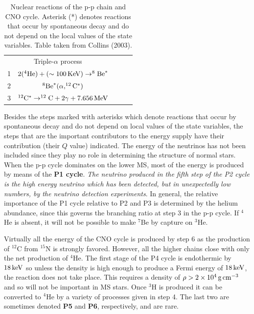 \documentclass[a4paper,10pt]{article}
\begin{document}
\begin{table}[t]
\begin{tabular}{lll|lll}
\cline{1-3}
\multicolumn{3}{c|}{Triple-$\alpha$ process} \\
\cline{1-3}
 1     & \multicolumn{2}{c|}{$2(^4{\rm He})+(\sim100\,{\rm KeV})\rightarrow^8{\rm Be}^*$} \\
 2     & \multicolumn{2}{c|}{$^8{\rm Be}^*(\alpha,^{12}{\rm C}^*)$} \\
 3     & \multicolumn{2}{c|}{$^{12}{\rm C}^*\rightarrow^{12}{\rm C}+2\gamma+7.656\,{\rm MeV}$} \\
 \hline
\end{tabular}
\caption{Nuclear reactions of the p-p chain and CNO cycle. Asterisk (*) denotes reactions that occur by spontaneous decay and do not depend on the local values of the state variables. Table taken from Collins (2003).}
\label{table:nuclearreactions}
\end{table}

{\noindent}Besides the steps marked with asterisks which denote reactions that occur by spontaneous decay and do not depend on local values of the state variables, the steps that are the important contributors to the energy supply have their contribution (their $Q$ value) indicated. The energy of the neutrinos has not been included since they play no role in determining the structure of normal stars. When the p-p cycle dominates on the lower MS, most of the energy is produced by means of the \textbf{P1 cycle}. \textit{The neutrino produced in the fifth step of the P2 cycle is the high energy neutrino which has been detected, but in unexpectedly low numbers, by the neutrino detection experiments}. In general, the relative importance of the P1 cycle relative to P2 and P3 is determined by the helium abundance, since this governs the branching ratio at step $3$ in the p-p cycle. If $^4$He is absent, it will not be possible to make $^7$Be by capture on $^3$He.

{\noindent}Virtually all the energy of the CNO cycle is produced by step 6 as the production of $^{12}$C from $^{15}$N is strongly favored. However, all the higher chains close with only the net production of $^4$He. The first stage of the P4 cycle is endothermic by $18\,{\rm keV}$ so unless the density is high enough to produce a Fermi energy of $18\,{\rm keV}$, the reaction does not take place. This requires a density of $\rho>2\times10^4\,{\rm g\,cm^{-3}}$ and so will not be important in MS stars. Once $^3$H is produced it can be converted to $^4$He by a variety of processes given in step 4. The last two are sometimes denoted \textbf{P5} and \textbf{P6}, respectively, and are rare.
\end{document}
